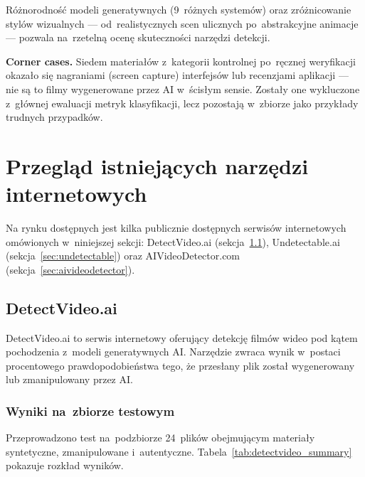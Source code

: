 R\'{o}\.{z}norodno\'{s}\'{c} modeli generatywnych (9~r\'{o}\.{z}nych system\'{o}w) oraz
zr\'{o}\.{z}nicowanie styl\'{o}w wizualnych --- od~realistycznych scen ulicznych
po~abstrakcyjne animacje --- pozwala na~rzeteln\k{a} ocen\k{e} skuteczno\'{s}ci
narz\k{e}dzi detekcji.

\textbf{Corner cases.}
Siedem materia\l{}\'{o}w z~kategorii kontrolnej po~r\k{e}cznej weryfikacji
okaza\l{}o si\k{e} nagraniami (screen capture) interfejs\'{o}w
lub recenzjami aplikacji --- nie s\k{a} to filmy wygenerowane przez AI
w~\'{s}cis\l{}ym sensie. Zosta\l{}y one wykluczone z~g\l{}\'{o}wnej ewaluacji
metryk klasyfikacji, lecz pozostaj\k{a} w~zbiorze jako przyk\l{}ady
trudnych przypadk\'{o}w.

\section{Przegl\k{a}d istniej\k{a}cych narz\k{e}dzi internetowych}
\label{sec:przeglad_narzedzi}

Na rynku dost\k{e}pnych jest kilka publicznie dost\k{e}pnych serwis\'{o}w internetowych
om\'{o}wionych w~niniejszej sekcji:
DetectVideo.ai (sekcja~\ref{sec:detectvideo}),
Undetectable.ai (sekcja~\ref{sec:undetectable})
oraz AIVideoDetector.com (sekcja~\ref{sec:aivideodetector}).

\subsection{DetectVideo.ai}
\label{sec:detectvideo}

DetectVideo.ai to serwis internetowy oferuj\k{a}cy detekcj\k{e} film\'{o}w wideo
pod k\k{a}tem pochodzenia z~modeli generatywnych AI.
Narz\k{e}dzie zwraca wynik w~postaci procentowego prawdopodobie\'{n}stwa
tego, \.{z}e przes\l{}any plik zosta\l{} wygenerowany lub zmanipulowany przez AI.

\subsubsection{Wyniki na~zbiorze testowym}

Przeprowadzono test na~podzbiorze 24~plik\'{o}w obejmuj\k{a}cym
materia\l{}y syntetyczne, zmanipulowane i~autentyczne.
Tabela~\ref{tab:detectvideo_summary} pokazuje rozk\l{}ad wynik\'{o}w.

